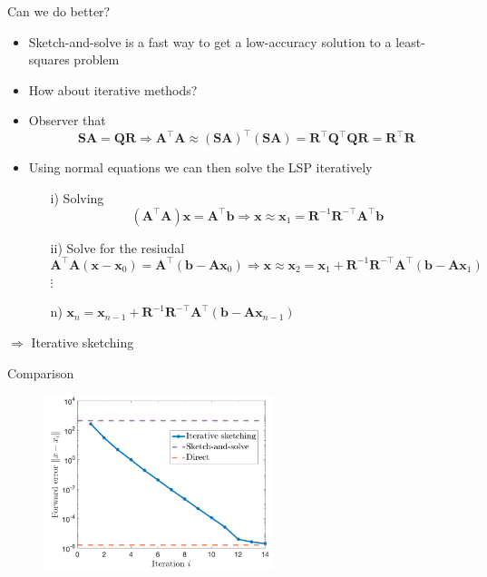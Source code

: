 \documentclass{beamer}
\newcommand{\bvec}[1]{\mathbf{#1}}
\newcommand{\vb}{\bvec{b}}
\newcommand{\vx}{\bvec{x}}
\newcommand{\vA}{\bvec{A}}
\newcommand{\vQ}{\bvec{Q}}
\newcommand{\vR}{\bvec{R}}
\newcommand{\vS}{\bvec{S}}
\newcommand{\bitem}{\item[$\bullet$]}
\begin{document}
\begin{frame}{Can we do better?}

\begin{itemize}
    \bitem Sketch-and-solve is a fast way to get a low-accuracy solution to a least-squares problem 
    \bitem How about iterative methods?
    \bitem Observer that 
    $$
    \vS \vA = \vQ \vR 
    \Rightarrow
    \vA^\top \vA
    \approx 
    (\vS \vA)^\top (\vS \vA)
    =
    \vR^\top \vQ^\top  \vQ \vR
    =
    \vR^\top \vR
    $$
    \bitem Using normal equations we can then solve the LSP iteratively
    \begin{itemize}
        \item[i)] Solving
        $$
        (\vA^\top \vA) \vx = \vA^\top \vb 
        \Rightarrow 
        \vx \approx \vx_1 = \vR^{-1} \vR^{-\top} \vA^\top \vb 
        $$
        \item[ii)] Solve for the resiudal
        $$
        \vA^\top \vA (\vx - \vx_0)
        =
        \vA^\top (\vb - \vA \vx_0)
        \Rightarrow
        \vx \approx 
        \vx_2
        =
        \vx_1 + \vR^{-1} \vR^{-\top}\vA^\top (\vb - \vA \vx_1) 
        $$
        $\vdots$
        \item[n)] $\vx_n
        =
        \vx_{n-1} + \vR^{-1} \vR^{-\top}\vA^\top (\vb - \vA \vx_{n-1})$
    \end{itemize}
\end{itemize}

\begin{center}
    $\Rightarrow$ Iterative sketching
\end{center}
\end{frame}

\begin{frame}{Comparison}

\begin{figure}
    \centering
    \includegraphics[width = 0.6\textwidth]{Graphics/IterativeSketching.png}
\end{figure}


\end{frame}
\end{document}
